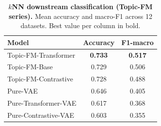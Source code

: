 \begin{table}[!htbp]
\centering
\caption{\textbf{$k$NN downstream classification (Topic-FM series).} Mean accuracy and macro-F1 across 12 datasets. Best value per column in bold.}
\label{tab:topic_knn}
\begin{tabular}{lcc}
\toprule
Model & Accuracy & F1-macro \\
\midrule
Topic-FM-Transformer & \textbf{0.733} & \textbf{0.517} \\
Topic-FM-Base & 0.729 & 0.506 \\
Topic-FM-Contrastive & 0.728 & 0.488 \\
Pure-VAE & 0.646 & 0.405 \\
Pure-Transformer-VAE & 0.617 & 0.368 \\
Pure-Contrastive-VAE & 0.603 & 0.355 \\
\bottomrule
\end{tabular}
\end{table}
